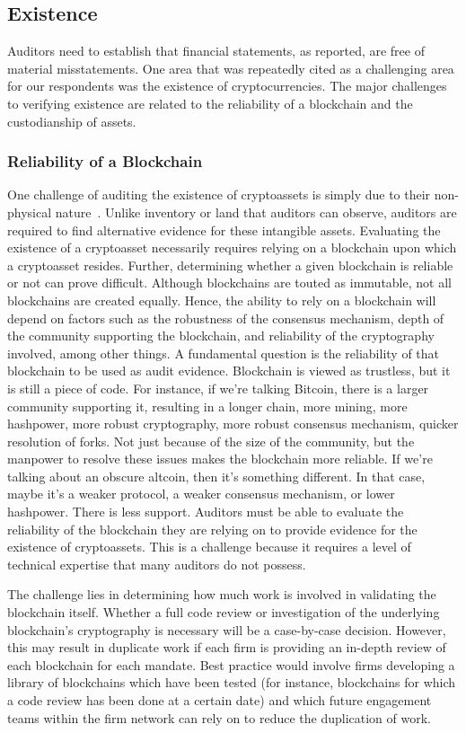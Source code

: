 \subsection{Existence} \label{sec:auditing:framework:existence}
Auditors need to establish that financial statements, as reported, are free of material misstatements. One area that was repeatedly cited as a challenging area for our respondents was the existence of cryptocurrencies. The major challenges to verifying existence are related to the reliability of a blockchain and the custodianship of assets.

\subsubsection{Reliability of a Blockchain}
One challenge of auditing the existence of cryptoassets is simply due to their non-physical nature~\cite{pimentel2021systemizing}. Unlike inventory or land that auditors can observe, auditors are required to find alternative evidence for these intangible assets. Evaluating the existence of a cryptoasset necessarily requires relying on a blockchain upon which a cryptoasset resides. Further, determining whether a given blockchain is reliable or not can prove difficult. Although blockchains are touted as immutable, not all blockchains are created equally. Hence, the ability to rely on a blockchain will depend on factors such as the robustness of the consensus mechanism, depth of the community supporting the blockchain, and reliability of the cryptography involved, among other things.
A fundamental question is the reliability of that blockchain to be used as audit evidence. Blockchain is viewed as trustless, but it is still a piece of code. For instance, if we're talking Bitcoin, there is a larger community supporting it, resulting in a longer chain, more mining, more hashpower, more robust cryptography, more robust consensus mechanism, quicker resolution of forks. Not just because of the size of the community, but the manpower to resolve these issues makes the blockchain more reliable. If we're talking about an obscure altcoin, then it's something different. In that case, maybe it's a weaker protocol, a weaker consensus mechanism, or lower hashpower. There is less support.
Auditors must be able to evaluate the reliability of the blockchain they are relying on to provide evidence for the existence of cryptoassets. This is a challenge because it requires a level of technical expertise that many auditors do not possess.

The challenge lies in determining how much work is involved in validating the blockchain itself. Whether a full code review or investigation of the underlying blockchain's cryptography is necessary will be a case-by-case decision. However, this may result in duplicate work if each firm is providing an in-depth review of each blockchain for each mandate. Best practice would involve firms developing a library of blockchains which have been tested (for instance, blockchains for which a code review has been done at a certain date) and which future engagement teams within the firm network can rely on to reduce the duplication of work.

